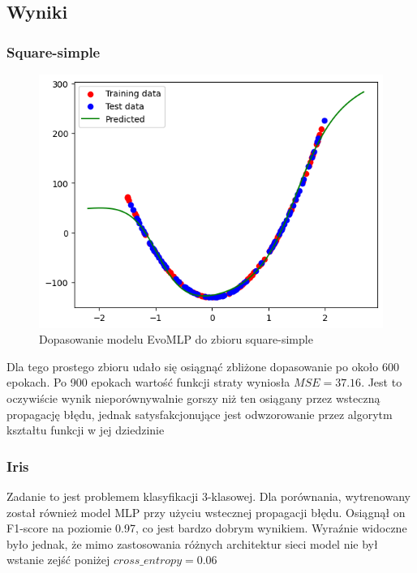 \documentclass{article}
\begin{document}
\subsection*{Wyniki}
\subsubsection*{Square-simple}

\begin{figure}[H]
    \centering
    \includegraphics[width=\textwidth]{img/ae3/square-simple_fit.png}
    \caption{Dopasowanie modelu EvoMLP do zbioru square-simple}
\end{figure}
Dla tego prostego zbioru udało się osiągnąć zbliżone dopasowanie po około 600 epokach. Po 900 epokach wartość funkcji straty wyniosła $MSE = 37.16$. Jest to oczywiście wynik nieporównywalnie gorszy niż ten osiągany przez wsteczną propagację błędu, jednak satysfakcjonujące jest odwzorowanie przez algorytm kształtu funkcji w jej dziedzinie
\newpage

\subsubsection*{Iris}
Zadanie to jest problemem klasyfikacji 3-klasowej. Dla porównania, wytrenowany został również model MLP przy użyciu wstecznej propagacji błędu. Osiągnął on F1-score na poziomie 0.97, co jest bardzo dobrym wynikiem. Wyraźnie widoczne było jednak, że mimo zastosowania różnych architektur sieci model nie był wstanie zejść poniżej $cross\_entropy = 0.06$
\end{document}
